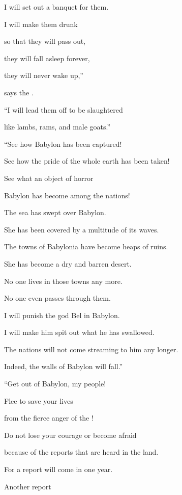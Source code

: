 {\par }{\Q I will set
out a banquet
for them.
\par }{\Q I will make them drunk
\par }{\Q so
that they will pass out,
\par }{\Q they will
fall asleep
forever,
\par }{\Q they will never
wake
up,”

\par }{\Q says
the {}.
\par }{\Q {}“I will lead
them off to be slaughtered
\par }{\Q like lambs,
rams,
and male goats.”
\par }{\Q {}“See how
Babylon
has been captured!
\par }{\Q See how the pride
of the whole
earth
has been taken!
\par }{\Q See what
an object of horror
\par }{\Q Babylon
has become among the nations!
\par }{\Q {}The sea
has swept
over
Babylon.
\par }{\Q She has been covered
by a multitude
of its waves.
\par }{\Q {}The towns
of Babylonia have become
heaps of ruins.
\par }{\Q She has become a dry
and barren desert.
\par }{\Q No
one
lives in those towns any more.
\par }{\Q No
one
even
passes through them.
\par }{\Q {}I will punish
the god Bel
in
Babylon.
\par }{\Q I will make him spit out
what he has swallowed.
\par }{\Q The nations
will not
come streaming
to
him any longer.
\par }{\Q Indeed,
the walls
of Babylon
will fall.”
\par }{\Q {}“Get out
of Babylon,
my people!
\par }{\Q Flee to save
your lives
\par }{\Q from the fierce
anger
of the {}!
\par }{\Q {}Do not
lose
your courage
or become
afraid
\par }{\Q because of the reports
that are heard
in the land.
\par }{\Q For a report
will come
in one year.
\par }{\Q Another report
}

